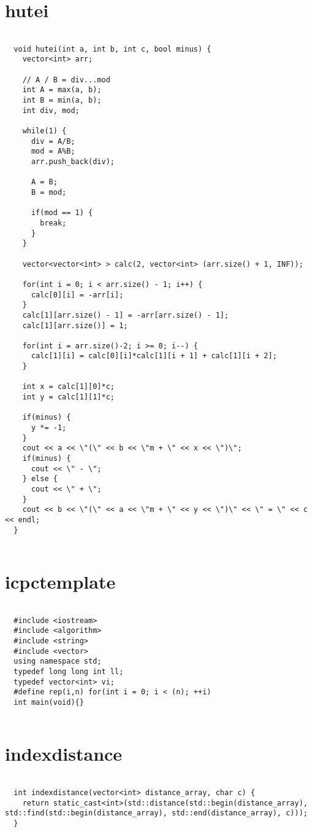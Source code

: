 \documentclass{jsarticle}
\begin{document}
\section{hutei}
\color{black}
\begin{lstlisting}[caption=hutei]

  void hutei(int a, int b, int c, bool minus) {
    vector<int> arr;
  
    // A / B = div...mod
    int A = max(a, b);
    int B = min(a, b);
    int div, mod;
  
    while(1) {
      div = A/B;
      mod = A%B;
      arr.push_back(div);
  
      A = B;
      B = mod;
  
      if(mod == 1) {
        break;
      }
    }
  
    vector<vector<int> > calc(2, vector<int> (arr.size() + 1, INF));
  
    for(int i = 0; i < arr.size() - 1; i++) {
      calc[0][i] = -arr[i];
    }
    calc[1][arr.size() - 1] = -arr[arr.size() - 1];
    calc[1][arr.size()] = 1;
  
    for(int i = arr.size()-2; i >= 0; i--) {
      calc[1][i] = calc[0][i]*calc[1][i + 1] + calc[1][i + 2];
    }
  
    int x = calc[1][0]*c;
    int y = calc[1][1]*c;
  
    if(minus) {
      y *= -1;
    }
    cout << a << \"(\" << b << \"m + \" << x << \")\";
    if(minus) {
      cout << \" - \";
    } else {
      cout << \" + \";
    }
    cout << b << \"(\" << a << \"m + \" << y << \")\" << \" = \" << c << endl;
  }
  

\end{lstlisting}

\color{white}
\section{icpctemplate}
\color{black}
\begin{lstlisting}[caption=icpctemplate]

  #include <iostream>
  #include <algorithm>
  #include <string>
  #include <vector>
  using namespace std;
  typedef long long int ll;
  typedef vector<int> vi;
  #define rep(i,n) for(int i = 0; i < (n); ++i)
  int main(void){}
  

\end{lstlisting}

\color{white}
\section{indexdistance}
\color{black}
\begin{lstlisting}[caption=indexdistance]

  int indexdistance(vector<int> distance_array, char c) {
    return static_cast<int>(std::distance(std::begin(distance_array), std::find(std::begin(distance_array), std::end(distance_array), c)));
  }
  

\end{lstlisting}
\end{document}
